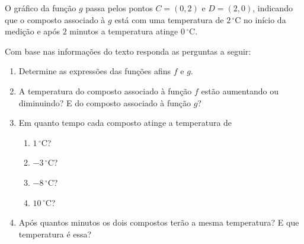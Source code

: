 \documentclass[10 pt,usenames,dvipsnames, oneside]{article}
\begin{document}
O gráfico da função \(g\) passa pelos pontos \(C=(0,2)\) e \(D=(2,0)\), indicando que o composto associado à \(g\) está com uma temperatura de \(2\,^{\circ}\mathrm{C}\) no início da medição e após \(2\) minutos a temperatura atinge \(0\,^{\circ}\mathrm{C}\).

Com base nas informações do texto responda as perguntas a seguir:
\begin{enumerate}
\item {} 
Determine as expressões das funções afins \(f\) e \(g\).

\item {} 
A temperatura do composto associado à função \(f\) estão aumentando ou diminuindo? E do composto associado à função \(g\)?

\item {} 
Em quanto tempo cada composto atinge a temperatura de

\begin{enumerate}
\item \(1\,^{\circ}\mathrm{C}\)?

\item \(-3\,^{\circ}\mathrm{C}\)?

\item \(-8\,^{\circ}\mathrm{C}\)?

\item \(10\,^{\circ}\mathrm{C}\)?
\end{enumerate}
\item {} 
Após quantos minutos os dois compostos terão a mesma temperatura? E que temperatura é essa?

\end{enumerate}
\end{document}
